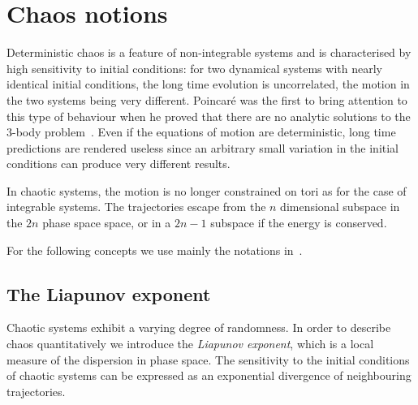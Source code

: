 \documentclass[../thesis.tex]{subfiles}
\theoremstyle{plain}
\begin{document}
%


\section{Chaos notions}

Deterministic chaos is a feature of non-integrable systems and is characterised
by high sensitivity to initial conditions: for two dynamical systems with
nearly identical initial conditions, the long time evolution is uncorrelated,
the motion in the two systems being very different.
Poincaré was the first to bring attention to this type of behaviour when he
proved that there are no analytic solutions to the 3-body problem~\cite{Diacu1996}.
Even if the equations of motion are deterministic, long time predictions are
rendered useless since an arbitrary small variation in the initial conditions
can produce very different results.

In chaotic systems, the motion is no longer constrained on tori as for the case
of integrable systems. The trajectories escape from the \(n\) dimensional subspace
in the \(2n\) phase space space, or in a \(2n-1\) subspace if the energy is
conserved.

For the following concepts we use mainly the notations in~\cite{Strogatz1994}.


\subsection{The Liapunov exponent}

Chaotic systems exhibit a varying degree of randomness. In order to describe
chaos quantitatively we introduce the \emph{Liapunov exponent}, which is a local measure
of the dispersion in phase space.
The sensitivity to the initial conditions of chaotic systems can be expressed
as an exponential divergence of neighbouring trajectories.
\end{document}

